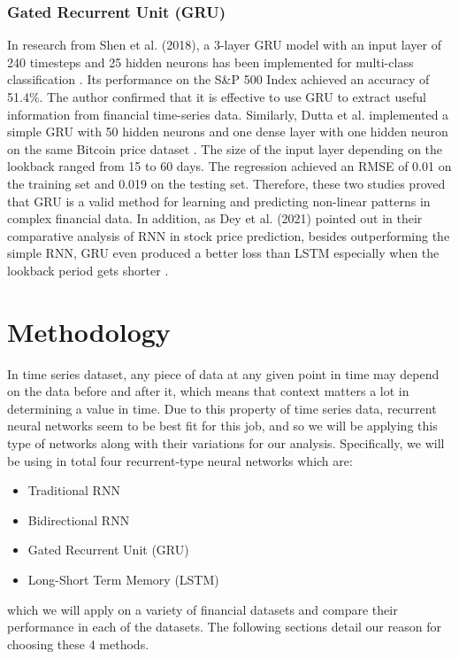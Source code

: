 \documentclass[letterpaper, 10 pt, conference]{ieeeconf}  %
\begin{document}
    \subsubsection{Gated Recurrent Unit (GRU)}
        In research from Shen et al. (2018), a 3-layer GRU model with an input layer of 240 timesteps and 25 hidden neurons has been implemented for multi-class classification \cite{SHEN2018895}. Its performance on the S\&P 500 Index achieved an accuracy of 51.4\%. The author confirmed that it is effective to use GRU to extract useful information from financial time-series data. Similarly, Dutta et al. implemented a simple GRU with 50 hidden neurons and one dense layer with one hidden neuron on the same Bitcoin price dataset \cite{dutta2019}. The size of the input layer depending on the lookback ranged from 15 to 60 days. The regression achieved an RMSE of 0.01 on the training set and 0.019 on the testing set. Therefore, these two studies proved that GRU is a valid method for learning and predicting non-linear patterns in complex financial data. In addition, as Dey et al. (2021) pointed out in their comparative analysis of RNN in stock price prediction, besides outperforming the simple RNN, GRU even produced a better loss than LSTM especially when the lookback period gets shorter \cite{a14080251}.

\section{Methodology}
    In time series dataset, any piece of data at any given point in time may depend on the data before and after it, which means that context matters a lot in determining a value in time. Due to this property of time series data, recurrent neural networks seem to be best fit for this job, and so we will be applying this type of networks along with their variations for our analysis. Specifically, we will be using in total four recurrent-type neural networks which are: 
    \begin{itemize}
        \item Traditional RNN
        \item Bidirectional RNN
        \item Gated Recurrent Unit (GRU)
        \item Long-Short Term Memory (LSTM)
    \end{itemize}
    which we will apply on a variety of financial datasets and compare their performance in each of the datasets. The following sections detail our reason for choosing these 4 methods.
    
\end{document}
